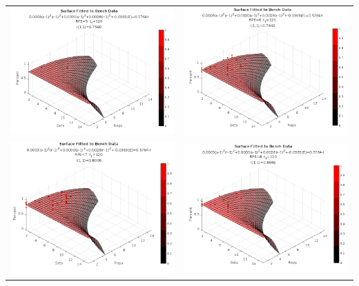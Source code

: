 \begin{table}[h]
    \centering
    \begin{tabular}{c|c}
        \includegraphics[width=80mm]{BenchSurface/5.png} &  
        \includegraphics[width=80mm]{BenchSurface/6.png} \\
         
        \includegraphics[width=80mm]{BenchSurface/7.png} &
        \includegraphics[width=80mm]{BenchSurface/8.png} \\
        

\end{tabular}
\end{table}
